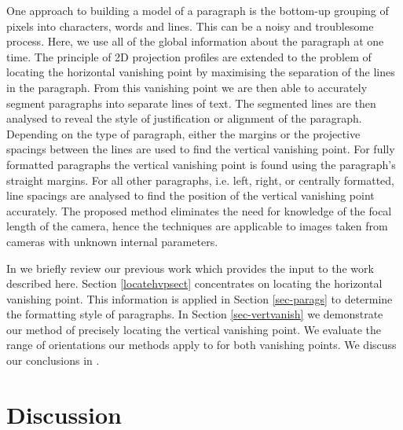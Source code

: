 \documentclass{elsart}   %
\begin{document}
One approach to building a model of a paragraph is the bottom-up grouping of
pixels into characters, words and lines. This can be a noisy and troublesome
process. Here, we use all of the global information about the paragraph at one
time.  The principle of 2D projection profiles are extended to the problem of
locating the horizontal vanishing point by maximising the separation of the
lines in the paragraph.  From this vanishing point we are then able to
accurately segment paragraphs into separate lines of text.  The segmented lines
are then analysed to reveal the style of justification or alignment of the
paragraph.  Depending on the type of paragraph, either the margins or the projective
spacings between the lines are used to find the vertical vanishing point. For
fully formatted paragraphs the vertical vanishing point is found
using the paragraph's straight margins. For all other paragraphs,  i.e. left,
right, or centrally formatted,  line spacings are analysed to find
the position of the vertical vanishing point accurately. 
The proposed method eliminates the need for knowledge of 
the focal length of the camera, hence the techniques are applicable to images
taken from cameras with unknown internal parameters.

 
 In 
we briefly review our previous work which provides the input to the work
described here.  Section \ref{locatehvpsect} concentrates on locating the
horizontal vanishing point. This information is applied in Section
\ref{sec-parags} to determine the formatting style of paragraphs.
In Section \ref{sec-vertvanish}  we demonstrate our method of precisely
locating the vertical vanishing point. We evaluate 
the range of orientations our methods apply to for both vanishing points. 
We discuss our conclusions in .






\section{Discussion} \label{conclusions}
\end{document}
